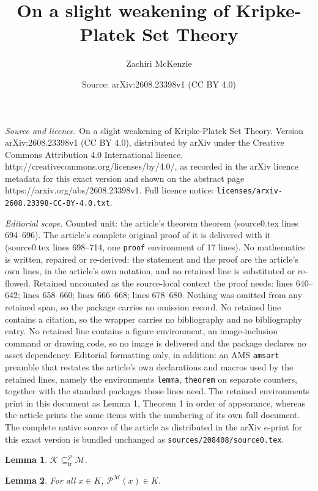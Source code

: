 \documentclass[10pt,a4paper]{amsart}
\title{On a slight weakening of Kripke-Platek Set Theory}
\author{Zachiri McKenzie}
\date{Source: arXiv:2608.23398v1 (CC BY 4.0)}
\newtheorem{lemma}{Lemma}
\begin{document}
\maketitle

\noindent\emph{Source and licence.} On a slight weakening of Kripke-Platek Set Theory. Version arXiv:2608.23398v1 (CC BY 4.0), distributed by arXiv under the Creative Commons Attribution 4.0 International licence, http://creativecommons.org/licenses/by/4.0/, as recorded in the arXiv licence metadata for this exact version and shown on the abstract page https://arxiv.org/abs/2608.23398v1. Full licence notice: \texttt{licenses/arxiv-2608.23398-CC-BY-4.0.txt}.\par\smallskip

\noindent\textit{Editorial scope.} Counted unit: the article's theorem theorem (source0.tex lines 694--696). The article's complete original proof of it is delivered with it (source0.tex lines 698--714, one \texttt{proof} environment of 17 lines). No mathematics is written, repaired or re-derived: the statement and the proof are the article's own lines, in the article's own notation, and no retained line is substituted or re-flowed.  Retained uncounted as the source-local context the proof needs: lines 640--642; lines 658--660; lines 666--668; lines 678--680.  Nothing was omitted from any retained span, so the package carries no omission record.  No retained line contains a citation, so the wrapper carries no bibliography and no bibliography entry.  No retained line contains a figure environment, an image-inclusion command or drawing code, so no image is delivered and the package declares no asset dependency.  Editorial formatting only, in addition: an AMS \texttt{amsart} preamble that restates the article's own declarations and macros used by the retained lines, namely the environments \texttt{lemma}, \texttt{theorem} on separate counters, together with the standard packages those lines need.  The retained environments print in this document as Lemma 1, Theorem 1 in order of appearance, whereas the article prints the same items with the numbering of its own full document.  The complete native source of the article as distributed in the arXiv e-print for this exact version is bundled unchanged as \texttt{sources/208408/source0.tex}.
\begin{lemma} \label{Th:KSuperTransitiveSubstructure}
$\mathcal{K} \subseteq_{\mathsf{tr}}^{\mathcal{P}} \mathcal{M}$.
\end{lemma} 

\begin{lemma} \label{Th:PowersetsInK}
For all $x \in K$, $\mathcal{P}^{\mathcal{M}}(x) \in K$.
\end{lemma}
\end{document}
